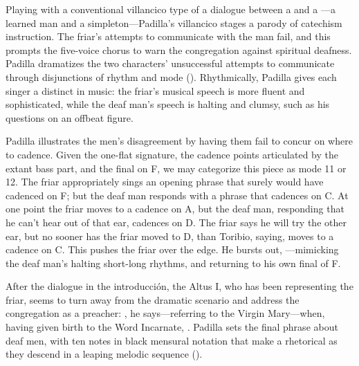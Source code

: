 
Playing with a conventional villancico type of a dialogue between a  and a ---a learned man and a simpleton---Padilla's villancico stages a parody of catechism instruction.
The friar's attempts to communicate with the  man fail, and this prompts the five-voice chorus to warn the congregation against spiritual deafness.
Padilla dramatizes the two characters' unsuccessful attempts to communicate through disjunctions of rhythm and mode ().
Rhythmically, Padilla gives each singer a distinct  in music: the friar's musical speech is more fluent and sophisticated, while the deaf man's speech is halting and clumsy, such as his questions  on an offbeat figure.

\begin{exmusic}
    \caption{Padilla, , introducción, , extant parts (missing Tenor I, Bassus I)}
    \label{exmusic:Padilla-Sordo-intro}
\end{exmusic}

Padilla illustrates the men's disagreement by having them fail to concur on where to cadence.
Given the one-flat  signature, the cadence points articulated by the extant bass part, and the final on F, we may categorize this piece as mode 11 or 12.
The friar appropriately sings an opening phrase that surely would have cadenced on F; but the deaf man responds with a phrase that cadences on C.
At one point the friar moves to a cadence on A, but the deaf man, responding that he can't hear out of that ear, cadences on D.
The friar says he will try the other ear, but no sooner has the friar moved to D, than Toribio, saying,  moves to a cadence on C.
This pushes the friar over the edge.
He bursts out, ---mimicking the deaf man's halting short-long rhythms, and returning to his own final of F.

After the dialogue in the introducción, the Altus I, who has been representing the friar, seems to turn away from the dramatic scenario and address the congregation as a preacher: , he says---referring to the Virgin Mary---when, having given birth to the Word Incarnate, .
Padilla sets the final phrase about deaf men, with ten notes in black mensural notation that make a rhetorical  as they descend in a leaping melodic sequence ().

